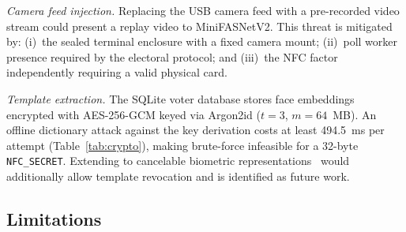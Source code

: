 \documentclass[pdflatex,sn-vancouver-num]{sn-jnl}%
\theoremstyle{thmstyleone}%
\theoremstyle{thmstyletwo}%
\theoremstyle{thmstylethree}%
\begin{document}
\textit{Camera feed injection.} Replacing the USB camera feed with a
pre-recorded video stream could present a replay video to MiniFASNetV2.
This threat is mitigated by: (i)~the sealed terminal enclosure with a fixed
camera mount; (ii)~poll worker presence required by the electoral protocol; and
(iii)~the NFC factor independently requiring a valid physical card.

\textit{Template extraction.} The SQLite voter database stores face embeddings
encrypted with AES-256-GCM keyed via Argon2id (\(t{=}3\), \(m{=}64\)~MB). An
offline dictionary attack against the key derivation costs at least 494.5~ms
per attempt (Table~\ref{tab:crypto}), making brute-force infeasible for a
32-byte \texttt{NFC\_SECRET}. Extending to cancelable biometric
representations~\cite{jain2008cancelable} would additionally allow template
revocation and is identified as future work.

\subsection{Limitations}\label{sec:limitations}
\end{document}
